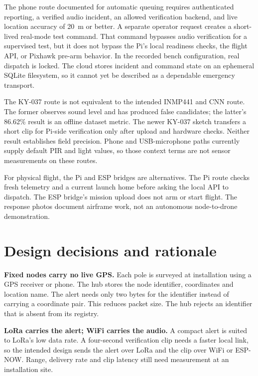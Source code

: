 \documentclass[12pt,a4paper]{report}
\begin{document}
The phone route documented for automatic queuing requires authenticated
reporting, a verified audio incident, an allowed verification backend,
and live location accuracy of 20~m or better. A separate operator
request creates a short-lived real-mode test command. That command
bypasses audio verification for a supervised test, but it does not
bypass the Pi's local readiness checks, the flight API, or Pixhawk
pre-arm behavior. In the recorded bench configuration, real dispatch
is locked. The cloud stores incident and command state on an ephemeral
SQLite filesystem, so it cannot yet be described as a dependable
emergency transport.

The KY-037 route is not equivalent to the intended INMP441 and CNN
route. The former observes sound level and has produced false
candidates; the latter's 86.62\% result is an offline dataset metric.
The newer KY-037 sketch transfers a short clip for Pi-side verification
only after upload and hardware checks. Neither result establishes
field precision. Phone and USB-microphone paths currently supply
default PIR and light values, so those context terms are not sensor
measurements on these routes.

For physical flight, the Pi and ESP bridges are alternatives. The Pi
route checks fresh telemetry and a current launch home before asking
the local API to dispatch. The ESP bridge's mission upload does not
arm or start flight. The response photos document airframe work, not
an autonomous node-to-drone demonstration.

\section{Design decisions and rationale}
\label{sec:rationale}

\textbf{Fixed nodes carry no live GPS.} Each pole is surveyed at
installation using a GPS receiver or phone. The hub stores the node
identifier, coordinates and location name. The alert needs only two
bytes for the identifier instead of carrying a coordinate pair. This
reduces packet size. The hub rejects an identifier that is absent from
its registry.

\textbf{LoRa carries the alert; WiFi carries the audio.} A compact
alert is suited to LoRa's low data rate. A four-second verification
clip needs a faster local link, so the intended design sends the alert
over LoRa and the clip over WiFi or ESP-NOW. Range, delivery rate and
clip latency still need measurement at an installation site.
\end{document}
